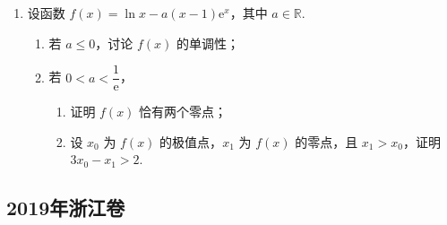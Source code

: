 \begin{description}
\begin{enumerate}[leftmargin=5pt]
        \item 设函数 \(f(x)=\ln x-a(x-1){\mathrm{e}}^x\)，其中 \(a\in\mathbb{R}\).

\begin{enumerate}
\item 若 \(a\le0\)，讨论 \(f(x)\) 的单调性；
\item 若 \(0<a<\dfrac1{\mathrm{e}}\)，
\begin{enumerate}
\item 证明 \(f(x)\) 恰有两个零点；
\item 设 \(x_0\) 为 \(f(x)\) 的极值点，\(x_1\) 为 \(f(x)\) 的零点，且 \(x_1>x_0\)，证明 \(3x_0-x_1>2\).
\end{enumerate}
\end{enumerate}

    \end{enumerate}

\end{description}


\subsection{2019年浙江卷}\label{gk:2019年浙江卷}


